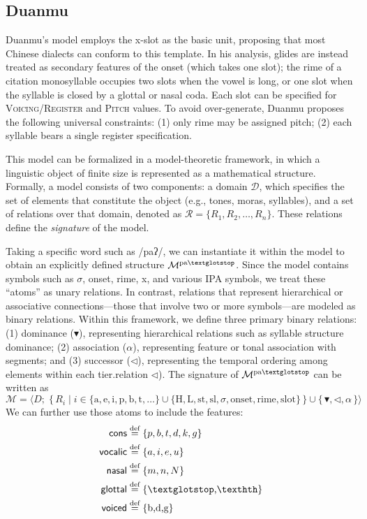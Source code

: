 \documentclass[11pt]{article}
\begin{document}
\subsection{Duanmu}
Duanmu’s model employs the x-slot as the basic unit, proposing that most
Chinese dialects can conform to this template. In his analysis, glides 
are instead treated as secondary features of the onset (which takes one
slot); the rime of a citation monosyllable occupies two slots when the vowel
is long, or one slot when the syllable is closed by a glottal or nasal coda.
Each slot can be specified for \textsc{Voicing/Register} and \textsc{Pitch}
values. To avoid over-generate, Duanmu proposes the following universal
constraints: (1) only rime may be assigned pitch; (2) each syllable bears a 
single register specification. 

This model can be formalized in a model-theoretic framework, in which a linguistic 
object of finite size is represented as a mathematical structure. Formally, a 
model consists of two components: a domain $\mathcal{D}$, which specifies the set 
of elements that constitute the object (e.g., tones, moras, syllables), and a set 
of relations over that domain, denoted as $\mathcal{R} = \{ R_1, R_2, \dots, R_n 
\}$. These relations define the \textit{signature }of the model.

Taking a specific word such as /paʔ/, we can instantiate it within the model to 
obtain an explicitly defined structure $\mathcal{M}^{\text{pa\textglotstop}}$. 
Since the model contains symbols such as $\sigma$, \textsf{onset}, \textsf{rime}, 
\textsf{x}, and various IPA symbols, we treat these “atoms” as unary relations. In 
contrast, relations that represent hierarchical or associative connections—those 
that involve two or more symbols—are modeled as binary relations. Within this 
framework, we define three primary binary relations: (1) dominance ($\blacktriangledown$), 
representing hierarchical relations such as syllable structure dominance;
(2) association ($\alpha$), representing feature or tonal association with 
segments; and
(3) successor ($\lhd$), representing the temporal ordering among elements within 
each tier.relation $\lhd$). The signature of $\mathcal{M}^{\text{pa\textglotstop}}$ can be written as
\[
\mathcal{M}
= \langle 
D;\;
\{\, R_i \mid i \in 
\{\text{a}, \text{e}, \text{i}, \text{p}, \text{b}, \text{t}, \ldots\}
\cup
\{\text{H}, \text{L}, \text{st}, \text{sl}, \sigma, \text{onset}, \text{rime}, \text{slot}\} \,\}
\cup
\{\,\blacktriangledown, \lhd, \alpha\,\}
\rangle
\]
We can further use those atoms to include the  features:
\begin{align*}
\textsf{cons} &\stackrel{\text{def}}{=} \{p,b,t,d,k,g\}\\
\textsf{vocalic} &\stackrel{\text{def}}{=} \{a,i,e,u\}\\
\textsf{nasal} &\stackrel{\text{def}}{=} \{m,n,N\}\\
\textsf{glottal} &\stackrel{\text{def}}{=} \{\text{\textglotstop,\texthth}\}\\
\textsf{voiced} &\stackrel{\text{def}}{=} \{\text{b,d,g}\}\\
\end{align*}

\end{document}
